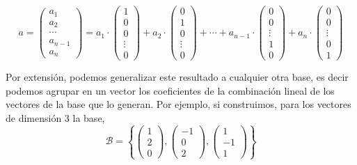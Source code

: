 \begin{equation*}
a=\begin{pmatrix}
a_1\\
a_2\\
\cdots  \\
a_{n-1}\\
a_n
\end{pmatrix} =a_1\cdot \begin{pmatrix}
1\\
0\\
0\\
\vdots \\
0
\end{pmatrix}+a_2 \cdot  \begin{pmatrix}
0\\
1\\
0\\
\vdots \\
0
\end{pmatrix}+
\cdots +
a_{n-1}\cdot \begin{pmatrix}
0\\
0\\
\vdots \\
1\\
0
\end{pmatrix}+
a_n\cdot \begin{pmatrix}
0\\
0\\
\vdots \\
0\\
1
\end{pmatrix}
\end{equation*}

Por extensión, podemos generalizar este resultado a cualquier otra base, es decir podemos agrupar en un vector los coeficientes de la combinación lineal de los vectores de la base que lo generan. Por ejemplo, si construimos, para los vectores de dimensión $3$ la base,
\begin{equation*}
\mathcal{B}=\left\lbrace \begin{pmatrix}
1\\
2\\
0
\end{pmatrix}, \begin{pmatrix}
-1\\
0\\
2
\end{pmatrix}, \begin{pmatrix}
1\\
-1\\
1
\end{pmatrix} \right\rbrace
\end{equation*} 


